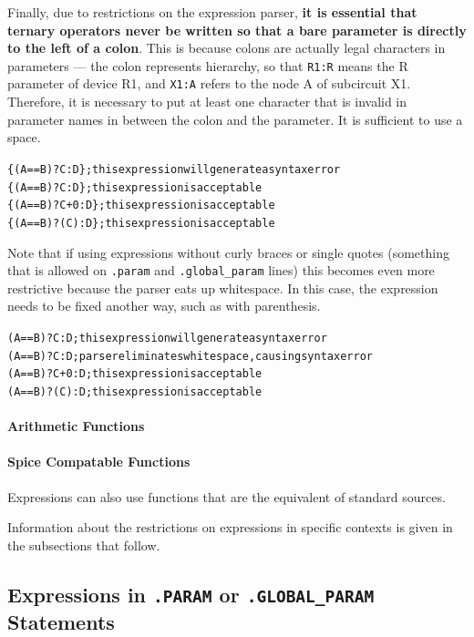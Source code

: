 Finally, due to restrictions on the expression parser, {\bf it is essential
that ternary operators never be written so that a bare parameter is
directly to the left of a colon}.  This is because colons are actually
legal characters in parameters --- the colon represents hierarchy, so
that \texttt{R1:R} means the R parameter of device R1, and
\texttt{X1:A} refers to the node A of subcircuit X1.  Therefore, it is
necessary to put at least one character that is invalid in parameter names
in between the colon and the parameter.  It is sufficient to use a space.
\begin{alltt}
  \color{red}  \{(A==B)?C:D\} ; this expression will generate a syntax error
    \{(A==B)?C :D\} ; this expression is acceptable
    \{(A==B)?C+0:D\} ; this expression is acceptable
    \{(A==B)?(C):D\} ; this expression is acceptable
\end{alltt}
Note that if using expressions without curly braces or single quotes 
(something that is allowed on \texttt{.param} and \texttt{.global\_param} lines)
this becomes even more restrictive because the parser eats up whitespace.  In
this case, the expression needs to be fixed another way, such as with parenthesis.
\begin{alltt}
  \color{red}  (A==B)?C:D ; this expression will generate a syntax error
    (A==B)?C :D ; parser eliminates whitespace, causing syntax error
    (A==B)?C+0:D ; this expression is acceptable
    (A==B)?(C):D ; this expression is acceptable
\end{alltt}

\paragraph{Arithmetic Functions}


\newpage
\paragraph{Spice Compatable Functions}
Expressions can also use functions that are the equivalent of standard sources.


Information about the restrictions on expressions in specific contexts
is given in the subsections that follow.

\subsection{Expressions in \texttt{.PARAM} or \texttt{.GLOBAL\_PARAM} Statements}

